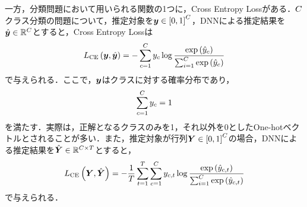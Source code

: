 一方，分類問題において用いられる関数の1つに，Cross Entropy Lossがある．$C$クラス分類の問題について，推定対象を$\bm{y} \in \left[0, 1\right]^{C}$，DNNによる推定結果を$\hat{\bm{y}} \in \mathbb{R}^{C}$とすると，Cross Entropy Lossは
\begin{equation}
    L_{\text{CE}}\left(\bm{y}, \hat{\bm{y}}\right) = - \sum_{c = 1}^{C} y_{c} \log \frac{\exp\left(\hat{y}_{c}\right)}{\sum_{i = 1}^{C} \exp\left(\hat{y}_{c}\right)}
\end{equation}
で与えられる．ここで，$\bm{y}$はクラスに対する確率分布であり，
\begin{equation}
    \sum_{c = 1}^{C} y_{c} = 1
\end{equation}
を満たす．実際は，正解となるクラスのみを1，それ以外を0としたOne-hotベクトルとされることが多い．また，推定対象が行列$\bm{Y} \in \left[0, 1\right]^{C}$の場合，DNNによる推定結果を$\hat{\bm{Y}} \in \mathbb{R}^{C \times T}$とすると，
\begin{equation}
    L_{\text{CE}}\left(\bm{Y}, \hat{\bm{Y}}\right) = - \frac{1}{T} \sum_{t = 1}^{T} \sum_{c = 1}^{C} y_{c, t} \log \frac{\exp\left(\hat{y}_{c, t}\right)}{\sum_{i = 1}^{C} \exp\left(\hat{y}_{c, t}\right)}
\end{equation}
で与えられる．

